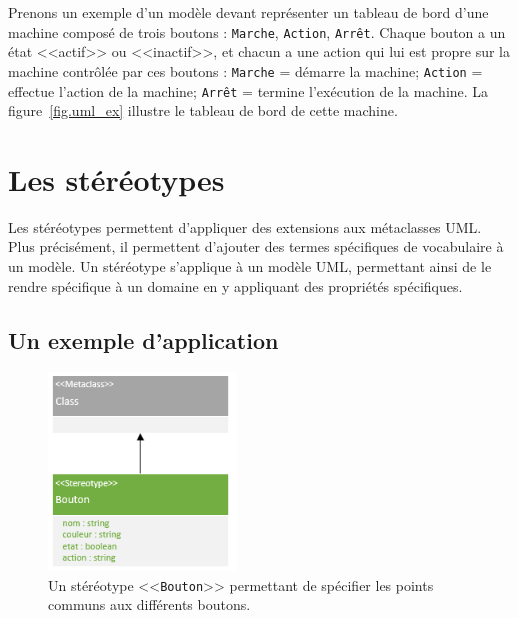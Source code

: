 Prenons un exemple d'un mod\`ele devant représenter un tableau de bord d'une machine composé de trois boutons : \texttt{Marche}, \texttt{Action}, \texttt{Arrêt}.
Chaque bouton a un état <<actif>> ou <<inactif>>, et
chacun a une action qui lui est propre sur la machine contr\^ol\'ee par ces boutons : \texttt{Marche} = démarre la machine; \texttt{Action} = effectue l'action de la machine; \texttt{Arrêt} = termine l'ex\'ecution de la machine.
%
La figure~\ref{fig.uml_ex} illustre le tableau de bord de cette machine.


\section{Les stéréotypes}
\label{sect.uml.ster}
Les stéréotypes permettent d'appliquer des extensions aux métaclasses UML.
Plus pr\'ecis\'ement, il permettent d'ajouter des termes spécifiques de vocabulaire à un mod\`ele.
Un stéréotype s'applique à un mod\`ele UML, permettant ainsi de le rendre spécifique à un domaine en y appliquant des propriétés spécifiques.

\subsection{Un exemple d'application}

\begin{figure}
    \begin{center}
    \includegraphics[width=5cm]{10_img/chap4/button.PNG}
    \caption{Un st\'er\'eotype <<\texttt{Bouton}>> permettant de sp\'ecifier les points communs aux diff\'erents boutons.}
    \label{fig.uml_but_definition}
    \end{center}
\end{figure}




